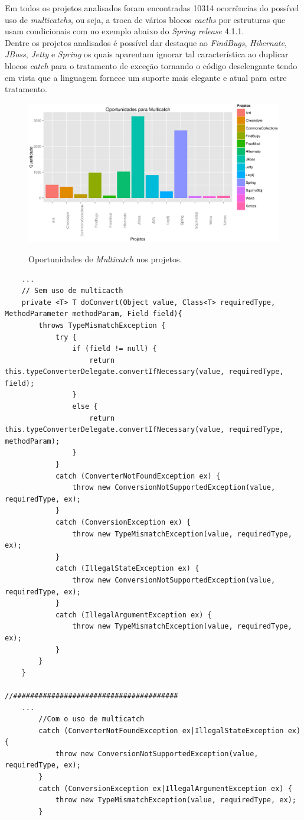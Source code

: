 Em todos os projetos analisados foram encontradas 10314 ocorrências do possível uso de \textit{multicatchs}, ou seja, a troca de vários blocos \textit{cacths} por estruturas que usam condicionais com no exemplo abaixo do \textit{Spring release} 4.1.1.\\

Dentre os projetos analisados é possível dar destaque ao \textit{FindBugs}, \textit{Hibernate}, \textit{JBoss}, \textit{Jetty} e \textit{Spring} os quais aparentam ignorar tal característica ao duplicar blocos \textit{catch} para o tratamento de exceção tornando o código deselengante tendo em vista que a linguagem fornece um suporte mais elegante e atual para estre tratamento.\\

\begin{figure}[h]
	\center
	\includegraphics[width=1.1\textwidth]{Imagens/multicatch}
	\label{fig:Muticatch}
	\caption{Oportunidades de \textit{Multicatch} nos projetos.}
\end{figure}
\clearpage

\begin{lstlisting}
	...
	// Sem uso de multicacth
	private <T> T doConvert(Object value, Class<T> requiredType, MethodParameter methodParam, Field field){
		throws TypeMismatchException {
			try {
				if (field != null) {
					return this.typeConverterDelegate.convertIfNecessary(value, requiredType, field);
				}
				else {
					return this.typeConverterDelegate.convertIfNecessary(value, requiredType, methodParam);
				}	
			}
			catch (ConverterNotFoundException ex) {
				throw new ConversionNotSupportedException(value, requiredType, ex);
			}
			catch (ConversionException ex) {
				throw new TypeMismatchException(value, requiredType, ex);
			}
			catch (IllegalStateException ex) {
				throw new ConversionNotSupportedException(value, requiredType, ex);
			}
			catch (IllegalArgumentException ex) {
				throw new TypeMismatchException(value, requiredType, ex);
			}
		}
	}
	
//#######################################
	...
		//Com o uso de multicatch
		catch (ConverterNotFoundException ex|IllegalStateException ex) {
			throw new ConversionNotSupportedException(value, requiredType, ex);
		}
		catch (ConversionException ex|IllegalArgumentException ex) {
			throw new TypeMismatchException(value, requiredType, ex);
		}

	
\end{lstlisting}

